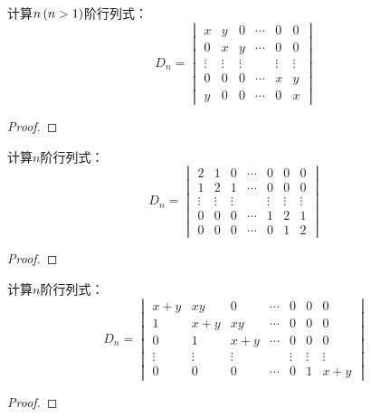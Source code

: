 \begin{problem}
计算\(n\left( n>1 \right)\)阶行列式：
\begin{equation*}
    D_n=
    \begin{vmatrix}
        x      & y      & 0      & \cdots & 0      & 0      \\
        0      & x      & y      & \cdots & 0      & 0      \\
        \vdots & \vdots & \vdots &        & \vdots & \vdots \\
        0      & 0      & 0      & \cdots & x      & y      \\
        y      & 0      & 0      & \cdots & 0      & x
    \end{vmatrix}
\end{equation*}
\end{problem}
\begin{proof}

\end{proof}

\begin{problem}
计算\(n\)阶行列式：
\begin{equation*}
    D_n=
    \begin{vmatrix}
        2      & 1      & 0      & \cdots & 0      & 0      & 0      \\
        1      & 2      & 1      & \cdots & 0      & 0      & 0      \\
        \vdots & \vdots & \vdots &        & \vdots & \vdots & \vdots \\
        0      & 0      & 0      & \cdots & 1      & 2      & 1      \\
        0      & 0      & 0      & \cdots & 0      & 1      & 2
    \end{vmatrix}
\end{equation*}
\end{problem}
\begin{proof}
\end{proof}

\begin{problem}
计算\(n\)阶行列式：
\begin{equation*}
    D_n=
    \begin{vmatrix}
        x+y    & xy     & 0      & \cdots & 0      & 0      & 0      \\
        1      & x+y    & xy     & \cdots & 0      & 0      & 0      \\
        0      & 1      & x+y    & \cdots & 0      & 0      & 0      \\
        \vdots & \vdots & \vdots &        & \vdots & \vdots & \vdots \\
        0      & 0      & 0      & \cdots & 0      & 1      & x+y
    \end{vmatrix}
\end{equation*}
\end{problem}
\begin{proof}

\end{proof}


